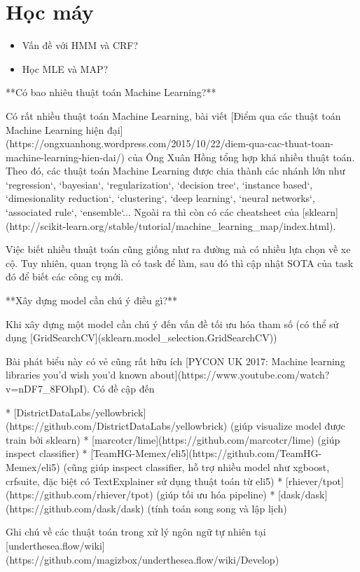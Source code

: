 \chapter{Học máy}

\begin{itemize}
  \item Vấn đề với HMM và CRF?
  \item Học MLE và MAP?
\end{itemize}


**Có bao nhiêu thuật toán Machine Learning?**

Có rất nhiều thuật toán Machine Learning, bài viết [Điểm qua các thuật toán Machine Learning hiện đại](https://ongxuanhong.wordpress.com/2015/10/22/diem-qua-cac-thuat-toan-machine-learning-hien-dai/) của Ông Xuân Hồng tổng hợp khá nhiều thuật toán. Theo đó, các thuật toán Machine Learning được chia thành các nhánh lớn như `regression`, `bayesian`, `regularization`, `decision tree`, `instance based`, `dimesionality reduction`, `clustering`, `deep learning`, `neural networks`, `associated rule`, `ensemble`... Ngoài ra thì còn có các cheatsheet của [sklearn](http://scikit-learn.org/stable/tutorial/machine_learning_map/index.html).

Việc biết nhiều thuật toán cũng giống như ra đường mà có nhiều lựa chọn về xe cộ. Tuy nhiên, quan trọng là có task để làm, sau đó thì cập nhật SOTA của task đó để biết các công cụ mới.

**Xây dựng model cần chú ý điều gì?**

Khi xây dựng một model cần chú ý đến vấn đề tối ưu hóa tham số (có thể sử dụng [GridSearchCV](sklearn.model_selection.GridSearchCV))

Bài phát biểu này có vẻ cũng rất hữu ích [PYCON UK 2017: Machine learning libraries you'd wish you'd known about](https://www.youtube.com/watch?v=nDF7_8FOhpI). Có đề cập đến

* [DistrictDataLabs/yellowbrick](https://github.com/DistrictDataLabs/yellowbrick) (giúp visualize model được train bởi sklearn)
* [marcotcr/lime](https://github.com/marcotcr/lime) (giúp inspect classifier)
* [TeamHG-Memex/eli5](https://github.com/TeamHG-Memex/eli5) (cũng giúp inspect classifier, hỗ trợ nhiều model như xgboost, crfsuite, đặc biệt có TextExplainer sử dụng thuật toán từ eli5)
* [rhiever/tpot](https://github.com/rhiever/tpot) (giúp tối ưu hóa pipeline)
* [dask/dask](https://github.com/dask/dask) (tính toán song song và lập lịch)

Ghi chú về các thuật toán trong xử lý ngôn ngữ tự nhiên tại [underthesea.flow/wiki](https://github.com/magizbox/underthesea.flow/wiki/Develop)

